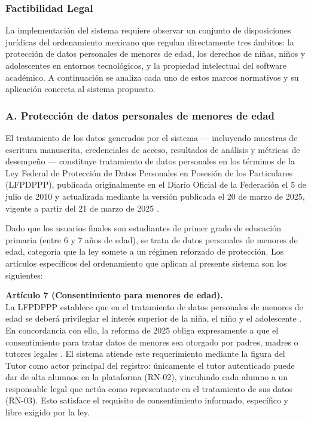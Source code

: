 \subsubsection{Factibilidad Legal}

La implementación del sistema requiere observar un conjunto de disposiciones jurídicas del ordenamiento mexicano que regulan directamente tres ámbitos: la protección de datos personales de menores de edad, los derechos de niñas, niños y adolescentes en entornos tecnológicos, y la propiedad intelectual del software académico. A continuación se analiza cada uno de estos marcos normativos y su aplicación concreta al sistema propuesto.

\subsubsection*{A. Protección de datos personales de menores de edad}
El tratamiento de los datos generados por el sistema — incluyendo muestras de escritura manuscrita, credenciales de acceso, resultados de análisis y métricas de desempeño — constituye tratamiento de datos personales en los términos de la Ley Federal de Protección de Datos Personales en Posesión de los Particulares (LFPDPPP), publicada originalmente en el Diario Oficial de la Federación el 5 de julio de 2010 y actualizada mediante la versión publicada el 20 de marzo de 2025, vigente a partir del 21 de marzo de 2025 \cite{lfpdppp2025}.

Dado que los usuarios finales son estudiantes de primer grado de educación primaria (entre 6 y 7 años de edad), se trata de datos personales de menores de edad, categoría que la ley somete a un régimen reforzado de protección. Los artículos específicos del ordenamiento que aplican al presente sistema son los siguientes:

\textbf{Artículo 7 (Consentimiento para menores de edad).} \\
La LFPDPPP establece que en el tratamiento de datos personales de menores de edad se deberá privilegiar el interés superior de la niña, el niño y el adolescente \cite{lfpdppp2025}. En concordancia con ello, la reforma de 2025 obliga expresamente a que el consentimiento para tratar datos de menores sea otorgado por padres, madres o tutores legales \cite{lfpdppp2025}. El sistema atiende este requerimiento mediante la figura del Tutor como actor principal del registro: únicamente el tutor autenticado puede dar de alta alumnos en la plataforma (RN-02), vinculando cada alumno a un responsable legal que actúa como representante en el tratamiento de sus datos (RN-03). Esto satisface el requisito de consentimiento informado, específico y libre exigido por la ley.

